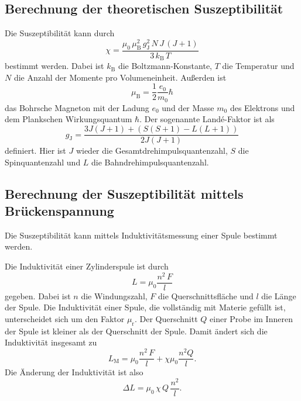 \subsection{Berechnung der theoretischen Suszeptibilität}
Die Suszeptibilität kann durch 
\begin{equation}
    \chi = \frac{\mu_0 \, \mu_\text{B}^2 \, g_\text{J}^2 \, N \, J \, (J+1)}{3 \, k_\text{B} \, T}
    \label{eqn:chitheo}
\end{equation}
bestimmt werden.
Dabei ist $k_\text{B}$ die Boltzmann-Konstante, $T$ die Temperatur und $N$ die Anzahl der 
Momente pro Volumeneinheit.
Außerden ist
\begin{equation*}
    \mu_\text{B} = \frac{1}{2} \frac{e_0}{m_0} \hbar 
\end{equation*}
das Bohrsche Magneton mit der Ladung $e_0$ und der Masse $m_0$ des Elektrons und dem Plankschen 
Wirkungsquantum $\hbar$. Der sogenannte Landé-Faktor ist als 
\begin{equation*}
    g_\text{J}= \frac{3 J(J+1) + (S(S+1) - L(L+1))}{2J(J+1)}
\end{equation*}
definiert. Hier ist $J$ wieder die Gesamtdrehimpulsquantenzahl, $S$ die Spinquantenzahl und $L$ 
die Bahndrehimpulsquantenzahl.


\subsection{Berechnung der Suszeptibilität mittels Brückenspannung}
Die Suszeptibilität kann mittels Induktivitätsmessung einer Spule
bestimmt werden.

\noindent Die Induktivität einer Zylinderspule ist durch
\begin{equation*}
    L = \mu_0 \frac{n^2 \, F}{l}
\end{equation*}
gegeben.
Dabei ist $n$ die Windungszahl, $F$ die Querschnittsfläche und $l$ die Länge der Spule.
Die Induktivität einer Spule, die vollständig mit Materie gefüllt ist,
unterscheidet sich um den Faktor $\mu_\text{r}$.
Der Querschnitt $Q$ einer Probe im Inneren der Spule ist kleiner als der Querschnitt 
der Spule.
Damit ändert sich die Induktivität insgesamt zu 
\begin{equation*}
    L_\text{M}= \mu_0 \frac{n^2 \, F}{l} + \chi \mu_0 \frac{n^2 Q}{l}.
    \label{eqn:induktivität}
\end{equation*}
Die Änderung der Induktivität ist also %
\begin{equation*}
    \Delta L = \mu_0 \, \chi \, Q \, \frac{n^2}{l}.
\end{equation*}

